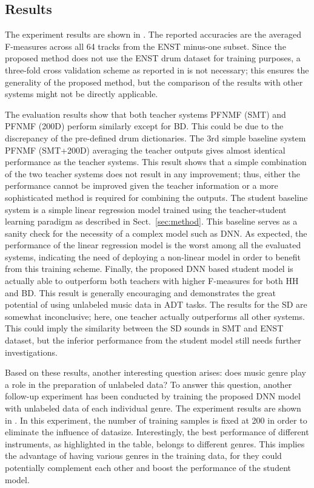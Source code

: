 \documentclass{article}
\begin{document}
\subsection{Results}
The experiment results are shown in . The reported accuracies are the averaged F-measures across all 64 tracks from the ENST minus-one subset. Since the proposed method does not use the ENST drum dataset for training purposes, a three-fold cross validation scheme as reported in \cite{Paulus2009a, Wu2015a, Vogl2016, Vogl2017, Southall2016} is not necessary; this ensures the generality of the proposed method, but the comparison of the results with other systems might not be directly applicable.  

%

%
The evaluation results show that both teacher systems PFNMF (SMT) and PFNMF (200D) perform similarly except for BD. This could be due to the discrepancy of the pre-defined drum dictionaries. 
The 3rd simple baseline system PFNMF (SMT+200D) averaging the teacher outputs gives almost identical performance as the teacher systems. This result shows that a simple combination of the two teacher systems does not result in any improvement; thus, either the performance cannot be improved given the teacher information or a more sophisticated method is required for combining the outputs. 
The student baseline system is a simple linear regression model trained using the teacher-student learning paradigm as described in Sect.~\ref{sec:method}. This baseline serves as a sanity check for the necessity of a complex model such as DNN. As expected, the performance of the linear regression model is the worst among all the evaluated systems, indicating the need of deploying a non-linear model in order to benefit from this training scheme. 
Finally, the proposed DNN based student model is actually able to outperform both teachers with higher F-measures for both HH and BD. This result is generally encouraging and demonstrates the great potential of using unlabeled music data in ADT tasks. The results for the SD are somewhat inconclusive; here, one teacher actually outperforms all other systems. This could imply the similarity between the SD sounds in SMT and ENST dataset, but the inferior performance from the student model still needs further investigations. 

Based on these results, another interesting question arises: does music genre play a role in the preparation of unlabeled data? To answer this question, another follow-up experiment has been conducted by training the proposed DNN model with unlabeled data of each individual genre. The experiment results are shown in . In this experiment, the number of training samples is fixed at 200 in order to eliminate the influence of datasize. Interestingly, the best performance of different instruments, as highlighted in the table, belongs to different genres. This implies the advantage of having various genres in the training data, for they could potentially complement each other and boost the performance of the student model. 
\end{document}
